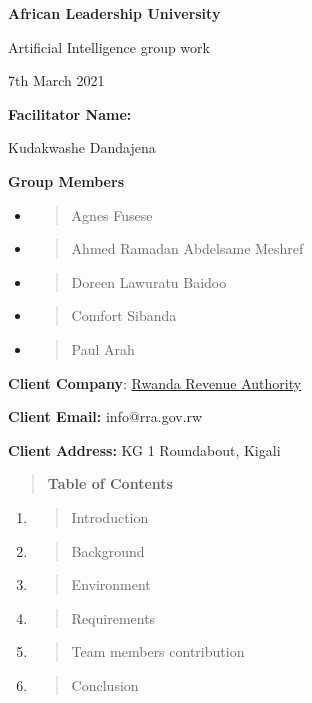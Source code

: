 \documentclass[]{article}
\date{}
\begin{document}
\textbf{African Leadership University}

Artificial Intelligence group work

7th March 2021

\textbf{Facilitator Name:}

Kudakwashe Dandajena

\textbf{Group Members}

\begin{itemize}
\item
  \begin{quote}
  Agnes Fusese
  \end{quote}
\item
  \begin{quote}
  Ahmed Ramadan Abdelsame Meshref
  \end{quote}
\item
  \begin{quote}
  Doreen Lawuratu Baidoo
  \end{quote}
\item
  \begin{quote}
  Comfort Sibanda
  \end{quote}
\item
  \begin{quote}
  Paul Arah
  \end{quote}
\end{itemize}

\textbf{Client Company}: \href{https://www.rra.gov.rw/}{Rwanda Revenue
Authority}

\textbf{Client Email:} info@rra.gov.rw

\textbf{Client Address:} KG 1 Roundabout, Kigali

\begin{quote}
\textbf{Table of Contents}
\end{quote}

\begin{enumerate}
\def\labelenumi{\arabic{enumi}.}
\item
  \begin{quote}
  Introduction
  \end{quote}
\item
  \begin{quote}
  Background
  \end{quote}
\item
  \begin{quote}
  Environment
  \end{quote}
\item
  \begin{quote}
  Requirements
  \end{quote}
\item
  \begin{quote}
  Team members contribution
  \end{quote}
\item
  \begin{quote}
  Conclusion
  \end{quote}
\end{enumerate}
\end{document}
